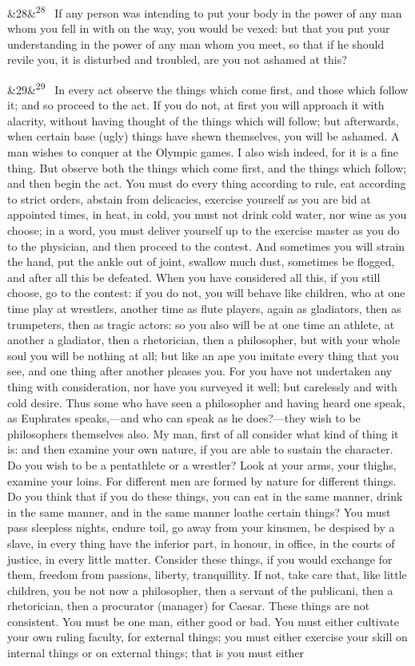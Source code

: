 \documentclass[12pt]{article}
\newcommand{\para}[1][]{\par\noindent\ifx&#1&\else\textsuperscript{\footnotesize #1}~\fi}
\begin{document}
\para[28] If any person was intending to put your body in the power of any man whom you fell in with on the way, you would be vexed: but that you put your understanding in the power of any man whom you meet, so that if he should revile you, it is disturbed and troubled, are you not ashamed at this?

\para[29] In every act observe the things which come first, and those which follow it; and so proceed to the act. If you do not, at first you will approach it with alacrity, without having thought of the things which will follow; but afterwards, when certain base (ugly) things have shewn themselves, you will be ashamed. A man wishes to conquer at the Olympic games. I also wish indeed, for it is a fine thing. But observe both the things which come first, and the things which follow; and then begin the act. You must do every thing according to rule, eat according to strict orders, abstain from delicacies, exercise yourself as you are bid at appointed times, in heat, in cold, you must not drink cold water, nor wine as you choose; in a word, you must deliver yourself up to the exercise master as you do to the physician, and then proceed to the contest. And sometimes you will strain the hand, put the ankle out of joint, swallow much dust, sometimes be flogged, and after all this be defeated. When you have considered all this, if you still choose, go to the contest: if you do not, you will behave like children, who at one time play at wrestlers, another time as flute players, again as gladiators, then as trumpeters, then as tragic actors: so you also will be at one time an athlete, at another a gladiator, then a rhetorician, then a philosopher, but with your whole soul you will be nothing at all; but like an ape you imitate every thing that you see, and one thing after another pleases you. For you have not undertaken any thing with consideration, nor have you surveyed it well; but carelessly and with cold desire. Thus some who have seen a philosopher and having heard one speak, as Euphrates speaks,---and who can speak as he does?---they wish to be philosophers themselves also. My man, first of all consider what kind of thing it is: and then examine your own nature, if you are able to sustain the character. Do you wish to be a pentathlete or a wrestler? Look at your arms, your thighs, examine your loins. For different men are formed by nature for different things. Do you think that if you do these things, you can eat in the same manner, drink in the same manner, and in the same manner loathe certain things? You must pass sleepless nights, endure toil, go away from your kinsmen, be despised by a slave, in every thing have the inferior part, in honour, in office, in the courts of justice, in every little matter. Consider these things, if you would exchange for them, freedom from passions, liberty, tranquillity. If not, take care that, like little children, you be not now a philosopher, then a servant of the publicani, then a rhetorician, then a procurator (manager) for Caesar. These things are not consistent. You must be one man, either good or bad. You must either cultivate your own ruling faculty, for external things; you must either exercise your skill on internal things or on external things; that is you must either 
\end{document}
